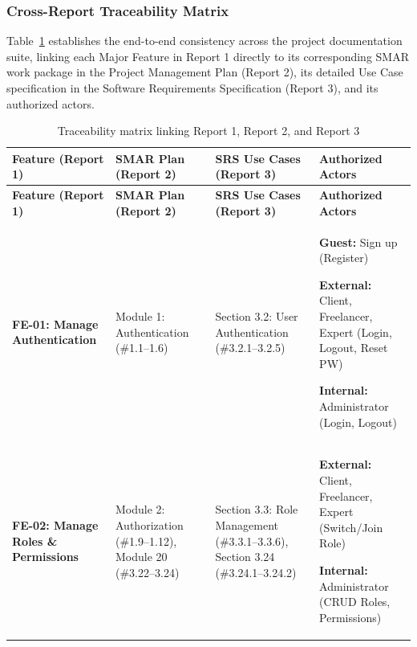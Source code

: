 \subsubsection*{Cross-Report Traceability Matrix}

Table~\ref{tab:feature-traceability} establishes the end-to-end consistency across the project documentation suite, linking each Major Feature in Report 1 directly to its corresponding SMAR work package in the Project Management Plan (Report 2), its detailed Use Case specification in the Software Requirements Specification (Report 3), and its authorized actors.

\begingroup
\small
\setlength{\tabcolsep}{4pt}
\begin{longtable}{|>{\raggedright\arraybackslash}p{2.8cm}|>{\raggedright\arraybackslash}p{2.7cm}|>{\raggedright\arraybackslash}p{3.5cm}|>{\raggedright\arraybackslash}p{5.0cm}|}
\caption{Traceability matrix linking Report 1, Report 2, and Report 3}
\label{tab:feature-traceability} \\
\hline
\rowcolor{fptHeader}
\textcolor{fptHeaderText}{\textbf{Feature (Report 1)}} & 
\textcolor{fptHeaderText}{\textbf{SMAR Plan (Report 2)}} & 
\textcolor{fptHeaderText}{\textbf{SRS Use Cases (Report 3)}} & 
\textcolor{fptHeaderText}{\textbf{Authorized Actors}} \\
\hline
\endfirsthead

\hline
\rowcolor{fptHeader}
\textcolor{fptHeaderText}{\textbf{Feature (Report 1)}} & 
\textcolor{fptHeaderText}{\textbf{SMAR Plan (Report 2)}} & 
\textcolor{fptHeaderText}{\textbf{SRS Use Cases (Report 3)}} & 
\textcolor{fptHeaderText}{\textbf{Authorized Actors}} \\
\hline
\endhead

\hline
\endfoot

\hline
\endlastfoot

\textbf{FE-01: Manage Authentication} & 
Module 1: Authentication (\#1.1--1.6) & 
Section 3.2: User Authentication (\#3.2.1--3.2.5) & 
\textbf{Guest:} Sign up (Register)\par
\textbf{External:} Client, Freelancer, Expert (Login, Logout, Reset PW)\par
\textbf{Internal:} Administrator (Login, Logout) \\ \hline

\textbf{FE-02: Manage Roles \& Permissions} & 
Module 2: Authorization (\#1.9--1.12), Module 20 (\#3.22--3.24) & 
Section 3.3: Role Management (\#3.3.1--3.3.6), Section 3.24 (\#3.24.1--3.24.2) & 
\textbf{External:} Client, Freelancer, Expert (Switch/Join Role)\par
\textbf{Internal:} Administrator (CRUD Roles, Permissions) \\ \hline


\end{longtable}
